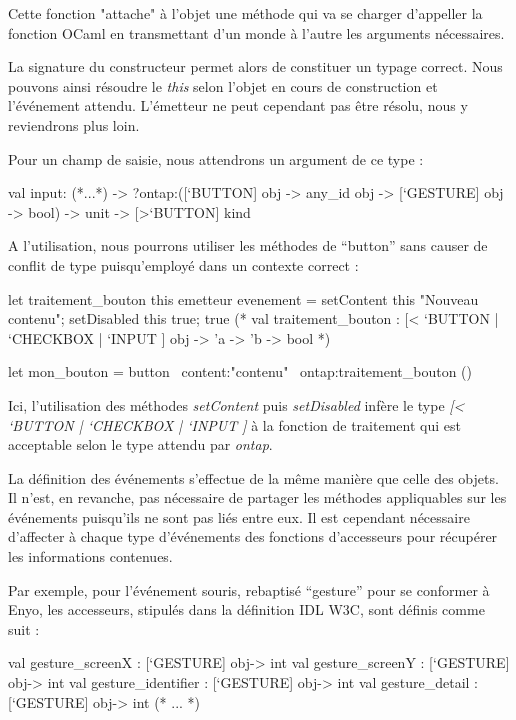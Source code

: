 \documentclass[11pt,a4paper]{report}
\begin{document}
Cette fonction "attache" à l'objet une méthode qui va se charger d'appeller la fonction OCaml
en transmettant d'un monde à l'autre les arguments nécessaires.

La signature du constructeur permet alors de constituer un typage correct.
Nous pouvons ainsi résoudre le \emph{this} selon l'objet en cours de construction et l'événement attendu.
L'émetteur ne peut cependant pas être résolu, nous y reviendrons plus loin.

Pour un champ de saisie, nous attendrons un argument de ce type :

\begin{OCaml}
  val input:
    (*...*)
    -> ?ontap:([`BUTTON] obj -> any_id obj -> [`GESTURE] obj -> bool)
    -> unit -> [>`BUTTON] kind
\end{OCaml}

A l'utilisation, nous pourrons utiliser les méthodes de ``button'' sans causer de conflit de type 
puisqu'employé dans un contexte correct :

\begin{OCaml}
let traitement_bouton this emetteur evenement = 
   setContent this "Nouveau contenu"; 
   setDisabled this true; 
   true
(*
val traitement_bouton :
  [< `BUTTON | `CHECKBOX | `INPUT ] obj -> 'a -> 'b -> bool
*)

let mon_bouton = button ~content:"contenu" ~ontap:traitement_bouton ()
\end{OCaml}

Ici, l'utilisation des méthodes \emph{setContent} puis \emph{setDisabled} infère le
type \emph{[< `BUTTON | `CHECKBOX | `INPUT ]} à la fonction de traitement qui est
acceptable selon le type attendu par \emph{ontap}.

La définition des événements s'effectue de la même manière que celle des objets. Il n'est, en
revanche, pas nécessaire de partager les méthodes appliquables sur les  événements puisqu'ils ne sont pas 
liés entre eux. Il est cependant nécessaire d'affecter à chaque type d'événements des fonctions d'accesseurs pour 
récupérer les informations contenues.

Par exemple, pour l'événement souris, rebaptisé ``gesture'' pour se conformer à Enyo, les accesseurs,
stipulés dans la définition IDL W3C, sont définis comme suit :

\begin{OCaml}
  val gesture_screenX : [`GESTURE] obj-> int
  val gesture_screenY : [`GESTURE] obj-> int
  val gesture_identifier : [`GESTURE] obj-> int
  val gesture_detail : [`GESTURE] obj-> int
  (* ... *)
\end{OCaml}
\medskip
\end{document}
